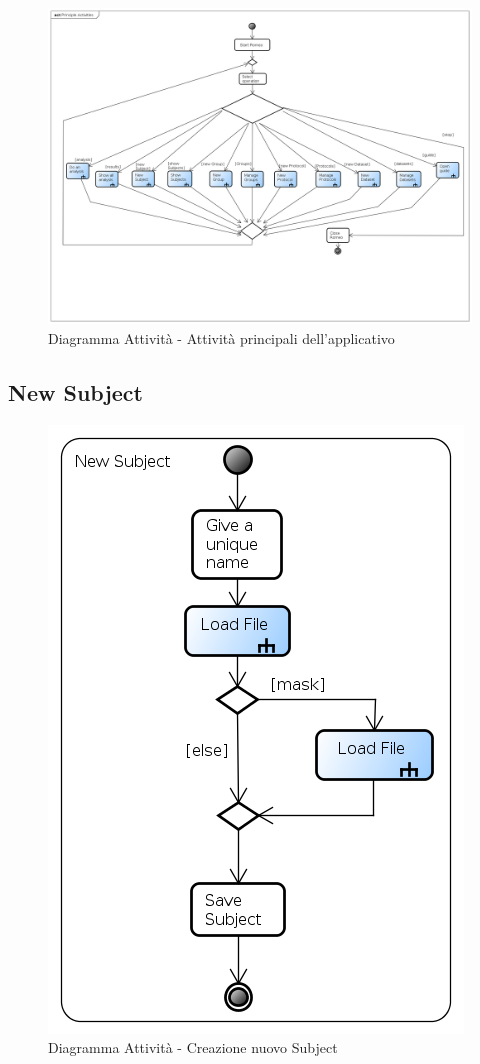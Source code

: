 \begin{landscape}
\begin{figure}[!h]
\centering
\includegraphics[width=0.9\linewidth]{./Content/Immagini/Principle_Activities}
\caption{Diagramma Attività - Attività principali dell'applicativo \project{}}
\label{generale}
\end{figure}
\end{landscape}
\pagebreak

\subsection{New Subject}
\label{newSub}
\begin{figure}[!h]
\centering
\includegraphics[width=0.6\linewidth]{./Content/Immagini/New_Subject}
\caption{Diagramma Attività - Creazione nuovo Subject}
\label{newS}
\end{figure}
